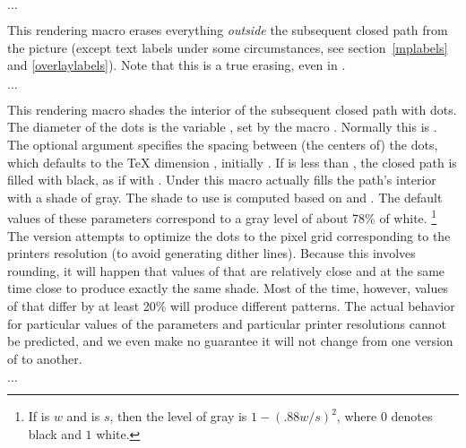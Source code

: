 \documentclass[letterpaper]{article}
\begin{document}
\begin{cd}
$\ldots$%
\end{cd}

This rendering macro erases everything \emph{outside} the subsequent
closed path from the picture (except text labels under some
circumstances, see section~\ref{mplabels} and \ref{overlaylabels}). Note
that this is a true erasing, even in \MP{}.

\begin{cd}
$\ldots$%
\end{cd}

This rendering macro shades the interior of the subsequent closed path
with dots. The diameter of the dots is the \MF{} variable ,
set by the macro . Normally this is
\dim{0.5bp}. The optional argument specifies the spacing between (the
centers of) the dots, which defaults to the \TeX{} dimension
, initially \dim{1pt}. If  is less than
, the closed path is filled with black, as if with
. Under \MP{} this macro actually fills the path's interior
with a shade of gray. The shade to use is computed based on
 and . The default values of these
parameters correspond to a gray level of about 78\% of white.%
    \footnote{If  is $w$ and  is $s$, then
    the level of gray is $1 - (.88w/s)^2$, where $0$ denotes black and
    $1$ white.} %
The \MF{} version attempts to optimize the dots to the pixel grid
corresponding to the printers resolution (to avoid generating dither
lines). Because this involves rounding, it will happen that values of
 that are relatively close and at the same time close to
 produce exactly the same shade. Most of the time, however,
values of  that differ by at least 20\% will produce
different patterns. The actual behavior for particular values of the
parameters and particular printer resolutions cannot be predicted, and
we even make no guarantee it will not change from one version of \mfp{}
to another.

\begin{cd}
$\ldots$%
\end{cd}
\end{document}
